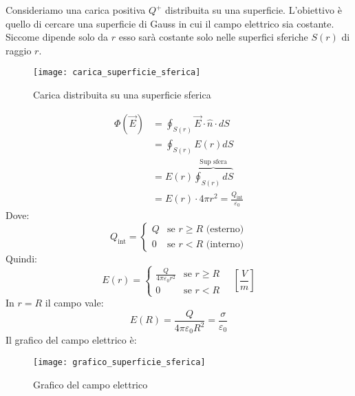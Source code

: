 \documentclass[a4paper]{article}
\begin{document}
\begin{example}
  Consideriamo una carica positiva \( Q^+ \) distribuita su una superficie. L'obiettivo
  è quello di cercare una superficie di Gauss in cui il campo elettrico sia costante.
  Siccome dipende solo da \( r \) esso sarà costante solo nelle superfici sferiche \( S(r) \) 
  di raggio \( r \).
  \begin{figure}[H]
    \centering
    \texttt{[image: carica\_superficie\_sferica]}
    \caption{Carica distribuita su una superficie sferica}
  \end{figure}
  \[
    \begin{aligned}
      \Phi(\vec{E}) &= \oint_{S(r)} \vec{E} \cdot \hat{n} \cdot dS\\
      &= \oint_{S(r)} E(r) dS\\
      &= E(r) \overbrace{\oint_{S(r)} dS}^{\text{Sup sfera}}\\
      &= E(r) \cdot 4 \pi r^2 = \frac{Q_{\text{int}}}{\varepsilon_0}
    \end{aligned}
  \]
  Dove:
  \[
    Q_{\text{int}} =
  \begin{cases}
    Q & \text{se } r \ge R \text{ (esterno)}\\
    0 & \text{se } r < R \text{ (interno)}
  \end{cases}
  \] 
  Quindi:
  \[
    E(r) = \begin{cases}
      \frac{Q}{4 \pi \varepsilon_0 r^2} & \text{se } r \ge R\\
      0 & \text{se } r < R
    \end{cases}
    \quad \left[ \frac{V}{m} \right]
  \] 
  In \( r = R \) il campo vale:
  \[
    E(R) = \frac{Q}{4 \pi \varepsilon_0 R^2} = \frac{\sigma}{\varepsilon_0}
  \] 
  Il grafico del campo elettrico è:
  \begin{figure}[H]
    \centering
    \texttt{[image: grafico\_superficie\_sferica]}
    \caption{Grafico del campo elettrico}
  \end{figure}
\end{example}
\end{document}
